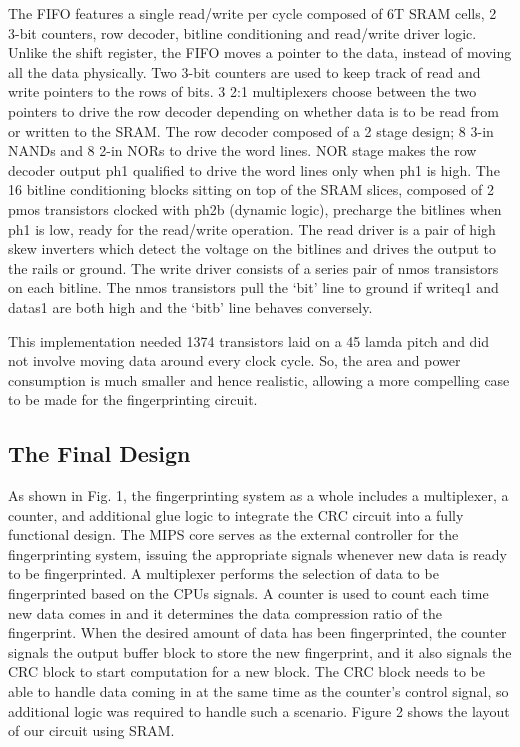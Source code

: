 \documentclass[10pt,journal,compsoc]{IEEEtran}
\begin{document}
The FIFO features a single read/write per cycle composed of 6T SRAM cells, 2 3-bit counters, row decoder, bitline conditioning and read/write driver logic. Unlike the shift register, the FIFO moves a pointer to the data, instead of moving all the data physically. Two 3-bit counters are used to keep track of read and write pointers to the rows of bits. 3 2:1 multiplexers choose between the two pointers to drive the row decoder depending on whether data is to be read from or written to the SRAM. The row decoder composed of a 2 stage design; 8 3-in NANDs and 8 2-in NORs to drive the word lines. NOR stage makes the row decoder output ph1 qualified to drive the word lines only when ph1 is high. The 16 bitline conditioning blocks sitting on top of the SRAM slices, composed of 2 pmos transistors clocked with ph2b (dynamic logic), precharge the bitlines when ph1 is low, ready for the read/write operation. The read driver is a pair of high skew inverters which detect the voltage on the bitlines and drives the output to the rails or ground. The write driver consists of a series pair of nmos transistors on each bitline. The nmos transistors pull the ‘bit’ line to ground if writeq1 and datas1 are both high and the ‘bitb’ line behaves conversely.  

This implementation needed 1374 transistors laid on a 45 lamda pitch and did not involve moving data around every clock cycle. So, the area and power consumption is much smaller and hence realistic, allowing a more compelling case to be made for the fingerprinting circuit. 


\subsection{The Final Design}
As shown in Fig. 1, the fingerprinting system as a whole includes a multiplexer, a counter, and additional glue logic to integrate the CRC circuit into a fully functional design. The MIPS core serves as the external controller for the fingerprinting system, issuing the appropriate signals whenever new data is ready to be fingerprinted. A multiplexer performs the selection of data to be fingerprinted based on the CPUs signals. A counter is used to count each time new data comes in and it determines the data compression ratio of the fingerprint. When the desired amount of data has been fingerprinted, the counter signals the output buffer block to store the new fingerprint, and it also signals the CRC block to start computation for a new block. The CRC block needs to be able to handle data coming in at the same time as the counter's control signal, so additional logic was required to handle such a scenario. Figure 2 shows the layout of our circuit using SRAM. 
\end{document}

